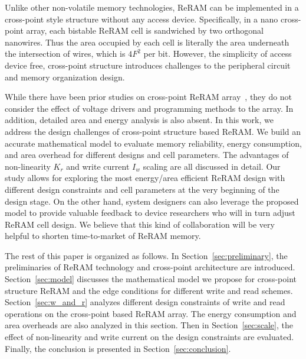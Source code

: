 Unlike other non-volatile memory technologies, ReRAM can be implemented in
a cross-point style structure without any access device. Specifically, in
a nano cross-point array, each bistable ReRAM cell is sandwiched by two
orthogonal nanowires. Thus the area occupied by each cell is literally the
area underneath the intersection of wires, which is $4F^2$ per bit.
However, the simplicity of access device free, cross-point structure
introduces challenges to the peripheral circuit and memory organization
design.

While there have been prior studies on cross-point ReRAM
array~\cite{crossbar_NANO2002_Ziegler,crossbar_NANO08_Flocke,crossbar_TED_2010,crossbar_NANO2003_Ziegler},
they do not consider the effect of voltage drivers and programming methods
to the array. In addition, detailed area and energy analysis is also
absent. In this work, we address the design challenges of cross-point
structure based ReRAM. We build an accurate mathematical model to evaluate
memory reliability, energy consumption, and area overhead for different
designs and cell parameters. The advantages of non-linearity $K_r$ and write
current $I_w$ scaling are all discussed in detail. Our study allows for
exploring the most energy/area efficient ReRAM design with different
design constraints and cell parameters at the very beginning of the design
stage. On the other hand, system designers can also leverage the proposed
model to provide valuable feedback to device researchers who will in turn
adjust ReRAM cell design. We believe that this kind of collaboration will
be very helpful to shorten time-to-market of ReRAM memory.

The rest of this paper is organized as follows. In
Section~\ref{sec:preliminary}, the preliminaries of ReRAM technology and
cross-point architecture are introduced. Section~\ref{sec:model} discusses
the mathematical model we propose for cross-point structure ReRAM and the
edge conditions for different write and read schemes.
Section~\ref{sec:w_and_r} analyzes different design constraints of write
and read operations on the cross-point based ReRAM array. The energy
consumption and area overheads are also analyzed in this section. Then in
Section~\ref{sec:scale}, the effect of non-linearity and write current on
the design constraints are evaluated. Finally, the conclusion is presented
in Section~\ref{sec:conclusion}.
